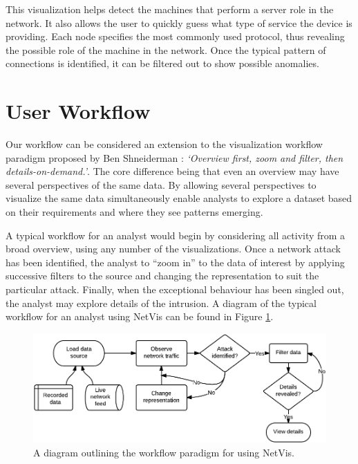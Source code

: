 This visualization helps detect the machines that perform a server role in the network.
It also allows the user to quickly guess what type of service the device is providing. Each node
specifies the most commonly used protocol, thus revealing the possible role of the machine in the
network. Once the typical pattern of connections is identified, it can be filtered out to show
possible anomalies.

\section{User Workflow} \label{sec:workflow}
%
Our workflow can be considered an extension to the visualization workflow paradigm proposed by Ben
Shneiderman \cite{shneiderman1996designing}: \textit{`Overview first, zoom and filter, then
details-on-demand.'}. The core difference being that even an overview may have several perspectives
of the same data. By allowing several perspectives to visualize the same data simultaneously enable
analysts to explore a dataset based on their requirements and where they see patterns emerging. 

A typical workflow for an analyst would begin by considering all activity from a broad overview,
using any number of the visualizations. Once a network attack has been identified, the analyst to
``zoom in'' to the data of interest by applying successive filters to the source and changing the
representation to suit the particular attack. Finally, when the exceptional behaviour has been
singled out, the analyst may explore details of the intrusion. A diagram of the typical workflow for
an analyst using NetVis can be found in Figure \ref{fig:workflow}.

\begin{figure}[htb]
   \centering
   \includegraphics[width=\linewidth]{materials/workflow-diagram.png}
   \caption[Workflow]{\label{fig:workflow}
         A diagram outlining the workflow paradigm for using NetVis.}
\end{figure}

